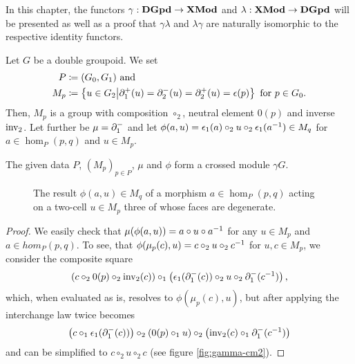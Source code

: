 In this chapter, the functors $\gamma : \mathbf{DGpd} \to \mathbf{XMod}$ and
$\lambda : \mathbf{XMod} \to \mathbf{DGpd}$ will be presented as well as a proof that $\gamma \lambda$
and $\lambda \gamma$ are naturally isomorphic to the respective identity functors.

\begin{lemma}
Let $G$ be a double groupoid. We set
\begin{align*}
P &\coloneqq (G_0,G_1) \text{ and } \\
M_p &\coloneqq \left\{ u \in G_2 \middle| \partial^+_1(u) = \partial^-_2(u) = \partial^+_2(u) = \epsilon(p) \right\}
	\text{ for $p \in G_0$.}
\end{align*}
Then, $M_p$ is a group with composition $\circ_2$, neutral element $0(p)$ and
inverse $\operatorname{inv_2}$.
Let further be $\mu = \partial^-_1$ and let $\phi(a,u) =
\epsilon_1(a) \circ_2 u \circ_2 \epsilon_1(a^{-1}) \in M_q$ for $a \in \hom_P(p,q)$
and $u \in M_p$.

The given data $P$, $(M_p)_{p \in P}$, $\mu$ and $\phi$ form a crossed module $\gamma G$.
\end{lemma}

\begin{figure} \centering
{}
\caption{The result $\phi(a,u) \in M_q$ of a morphism $a \in \hom_P(p,q)$ acting
on a two-cell $u \in M_p$ three of whose faces are degenerate.}
\label{fig:gamma-phi}
\end{figure}

\begin{proof}
We easily check that $\mu(\phi(a,u)) = a \circ u \circ a^{-1}$ for any $u \in M_p$
and $a \in hom_P(p,q)$.
To see, that $\phi(\mu_p(c),u) = c \circ_2 u \circ_2 c^{-1}$ for $u,c \in M_p$,
we consider the composite square
\begin{equation*}
\left(c \circ_2 0(p) \circ_2 \operatorname{inv_2}(c)\right) \circ_1
	\left(\epsilon_1(\partial^-_1(c)) \circ_2 u \circ_2 \partial^-_1(c^{-1})\right) \text{,}
\end{equation*}
which, when evaluated as is, resolves to $\phi(\mu_p(c),u)$, but after applying
the interchange law twice becomes
\begin{equation*}
\left(c \circ_1 \epsilon_1(\partial^-_1(c))\right)
	\circ_2 \left(0(p) \circ_1 u\right)
	\circ_2 \left(\operatorname{inv_2}(c) \circ_1 \partial^-_1(c^{-1})\right)
\end{equation*}
and can be simplified to $c \circ_2 u \circ_2 c$ (see figure \ref{fig:gamma-cm2}).
\end{proof}

